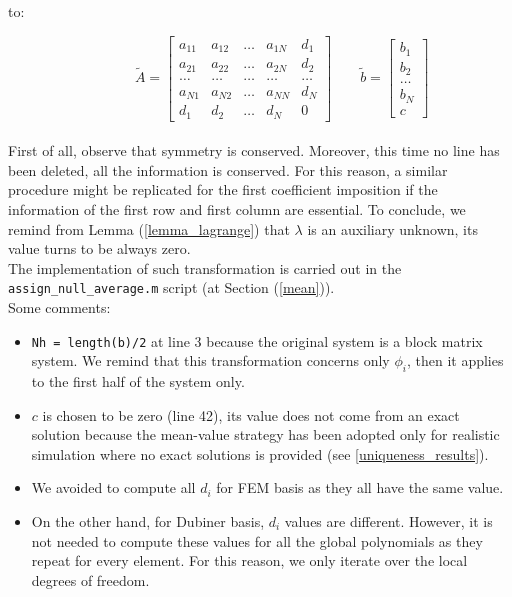 \documentclass[a4paper,11pt]{article}
\begin{document}
\noindent to:

\begin{equation*}
\quad \quad  \quad \, \tilde{A}=\begin{bmatrix}
a_{11} & a_{12} & \dots & a_{1N} & d_1\\ 
a_{21} & a_{22} & \dots & a_{2N} & d_2 \\ 
\dots & \dots & \dots & \dots & \dots \\
a_{N1}  & a_{N2} & \dots & a_{NN} & d_N \\
d_1 & d_2 & \dots & d_N & 0
\end{bmatrix} \quad \quad
\tilde{b}=\begin{bmatrix}
b_1 \\ b_2 \\ \dots \\ b_N \\ c
\end{bmatrix}
\end{equation*}
\vspace{3mm} \\
\noindent First of all, observe that symmetry is conserved. Moreover, this time no line has been deleted, all the information is conserved. For this reason, a similar procedure might be replicated for the first coefficient imposition if the information of the first row and first column are essential. To conclude, we remind from Lemma (\ref{lemma_lagrange}) that $\lambda$ is an auxiliary unknown, its value turns to be always zero. \\

\noindent The implementation of such transformation is carried out in the \texttt{assign\_null\_average.m} script (at Section (\ref{mean})).\\
\vspace{2mm}
\noindent Some comments:
\begin{itemize}
	\item \texttt{Nh = length(b)/2} at line 3 because the original system is a block matrix system. We remind that this transformation concerns only $\phi_i$, then it applies to the first half of the system only.
	\item $c$ is chosen to be zero (line 42), its value does not come from an exact solution because the mean-value strategy has been adopted only for realistic simulation where no exact solutions is provided (see \ref{uniqueness_results}). 
	\item We avoided to compute all $d_i$ for FEM basis as they all have the same value.
	\item On the other hand, for Dubiner basis, $d_i$ values are different. However, it is not needed to compute these values for all the global polynomials as they repeat for every element. For this reason, we only iterate over the local degrees of freedom.
\end{itemize}
\end{document}
